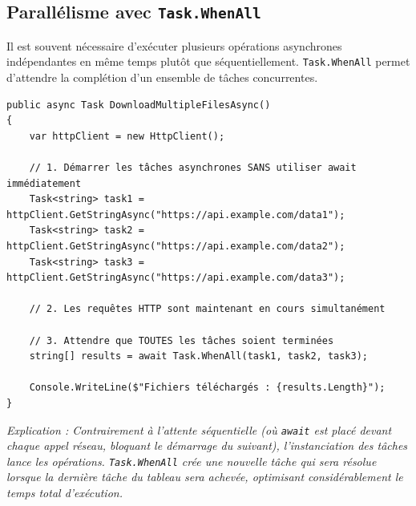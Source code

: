 \subsection{Parallélisme avec \texttt{Task.WhenAll}}

Il est souvent nécessaire d'exécuter plusieurs opérations asynchrones indépendantes en même temps plutôt que séquentiellement. \texttt{Task.WhenAll} permet d'attendre la complétion d'un ensemble de tâches concurrentes.

\begin{lstlisting}[language={[Sharp]C}]
public async Task DownloadMultipleFilesAsync()
{
    var httpClient = new HttpClient();

    // 1. Démarrer les tâches asynchrones SANS utiliser await immédiatement
    Task<string> task1 = httpClient.GetStringAsync("https://api.example.com/data1");
    Task<string> task2 = httpClient.GetStringAsync("https://api.example.com/data2");
    Task<string> task3 = httpClient.GetStringAsync("https://api.example.com/data3");

    // 2. Les requêtes HTTP sont maintenant en cours simultanément
    
    // 3. Attendre que TOUTES les tâches soient terminées
    string[] results = await Task.WhenAll(task1, task2, task3);

    Console.WriteLine($"Fichiers téléchargés : {results.Length}");
}
\end{lstlisting}
\textit{Explication : Contrairement à l'attente séquentielle (où \texttt{await} est placé devant chaque appel réseau, bloquant le démarrage du suivant), l'instanciation des tâches lance les opérations. \texttt{Task.WhenAll} crée une nouvelle tâche qui sera résolue lorsque la dernière tâche du tableau sera achevée, optimisant considérablement le temps total d'exécution.}

